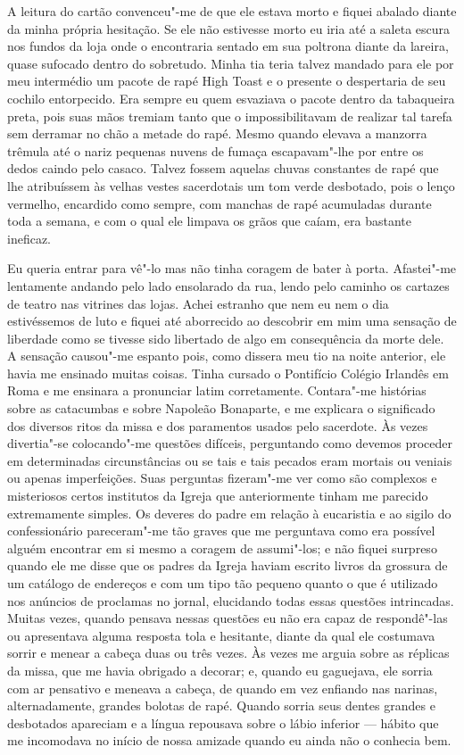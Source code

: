 A leitura do cartão convenceu"-me de que ele estava morto e fiquei abalado
diante da minha própria hesitação.  Se ele não estivesse morto eu iria até a
saleta escura nos fundos da loja onde o encontraria sentado em sua poltrona
diante da lareira, quase sufocado dentro do sobretudo.  Minha tia teria talvez
mandado para ele por meu intermédio um pacote de rapé High Toast e o presente o
despertaria de seu cochilo entorpecido.  Era sempre eu quem esvaziava o pacote
dentro da tabaqueira preta, pois suas mãos tremiam tanto que o impossibilitavam
de realizar tal tarefa sem derramar no chão a metade do rapé.  Mesmo quando
elevava a manzorra trêmula até o nariz pequenas nuvens de fumaça escapavam"-lhe
por entre os dedos caindo pelo casaco.  Talvez fossem aquelas chuvas constantes
de rapé que lhe atribuíssem às velhas vestes sacerdotais um tom verde
desbotado, pois o lenço vermelho, encardido como sempre, com manchas de rapé
acumuladas durante toda a semana, e com o qual ele limpava os grãos que caíam,
era bastante ineficaz.

Eu queria entrar para vê"-lo mas não tinha coragem de bater à porta.  Afastei"-me
lentamente andando pelo lado ensolarado da rua, lendo pelo caminho os cartazes
de teatro nas vitrines das lojas.  Achei estranho que nem eu nem o dia
estivéssemos de luto e fiquei até aborrecido ao descobrir em mim uma sensação
de liberdade como se tivesse sido libertado de algo em consequência da morte
dele.  A sensação causou"-me espanto pois, como dissera meu tio na noite
anterior, ele havia me ensinado muitas coisas.  Tinha cursado o Pontifício
Colégio Irlandês em Roma e me ensinara a pronunciar latim corretamente.
Contara"-me histórias sobre as catacumbas e sobre Napoleão Bonaparte, e me
explicara o significado dos diversos ritos da missa e dos paramentos usados
pelo sacerdote.  Às vezes divertia"-se colocando"-me questões difíceis,
perguntando como devemos proceder em determinadas circunstâncias ou se tais e
tais pecados eram mortais ou veniais ou apenas imperfeições.  Suas perguntas
fizeram"-me ver como são complexos e misteriosos certos institutos da Igreja que
anteriormente tinham me parecido extremamente simples.  Os deveres do padre em
relação à eucaristia e ao sigilo do confessionário pareceram"-me tão graves que
me perguntava como era possível alguém encontrar em si mesmo a coragem de
assumi"-los; e não fiquei surpreso quando ele me disse que os padres da Igreja
haviam escrito livros da grossura de um catálogo de endereços e com um tipo tão
pequeno quanto o que é utilizado nos anúncios de proclamas no jornal,
elucidando todas essas questões intrincadas.  Muitas vezes, quando pensava
nessas questões eu não era capaz de respondê"-las ou apresentava alguma resposta
tola e hesitante, diante da qual ele costumava sorrir e menear a cabeça duas ou
três vezes.  Às vezes me arguia sobre as réplicas da missa, que me havia
obrigado a decorar; e, quando eu gaguejava, ele sorria com ar pensativo e
meneava a cabeça, de quando em vez enfiando nas narinas, alternadamente,
grandes bolotas de rapé.  Quando sorria seus dentes grandes e desbotados
apareciam e a língua repousava sobre o lábio inferior --- hábito que me
incomodava no início de nossa amizade quando eu ainda não o conhecia bem.

